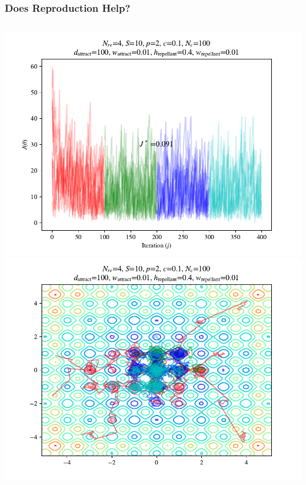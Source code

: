 \documentclass{beamer}
\begin{document}
\begin{frame}
\frametitle{Does Reproduction Help?}
\begin{columns}[T]
    \begin{center}
      \includegraphics[scale=0.3]{assets/rastrigin_colony_re_J}
      \includegraphics[scale=0.3]{assets/rastrigin_colony_re_theta}
    \end{center}

\end{columns}
\end{frame}
\end{document}

